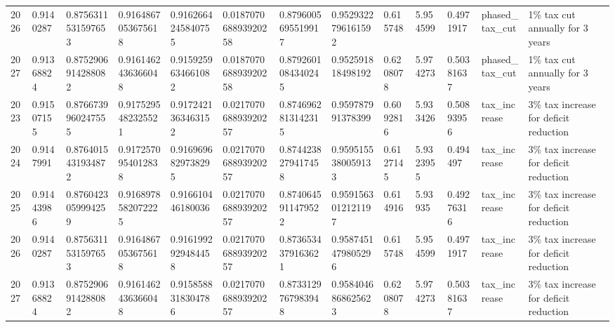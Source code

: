 \begin{sidewaystable}[H]
\begin{tabular}{|l|l|l|l|l|l|l|l|l|l|l|l|l|}
2026 & 0.9140287 & 0.8756311531597653 & 0.9164867053675618 & 0.9162664245840755 & 0.018707068893920258 & 0.8796005695519917 & 0.9529322796161592 & 0.615748 & 5.954599 & 0.4971917 & phased\_tax\_cut & 1\% tax cut annually for 3 years \\
2027 & 0.91368824 & 0.8752906914288082 & 0.9161462436366048 & 0.9159259634661082 & 0.018707068893920258 & 0.8792601084340245 & 0.952591818498192 & 0.6208078 & 5.974273 & 0.50381637 & phased\_tax\_cut & 1\% tax cut annually for 3 years \\
\hline
2023 & 0.91507155 & 0.8766739960247555 & 0.9175295482325521 & 0.9172421363463152 & 0.021707068893920257 & 0.8746962813142315 & 0.959787991378399 & 0.6092816 & 5.933426 & 0.50893956 & tax\_increase & 3\% tax increase for deficit reduction \\
2024 & 0.9147991 & 0.8764015431934872 & 0.9172570954012838 & 0.9169696829738295 & 0.021707068893920257 & 0.8744238279417458 & 0.9595155380059133 & 0.6127145 & 5.9323955 & 0.494497 & tax\_increase & 3\% tax increase for deficit reduction \\
2025 & 0.91443986 & 0.8760423059994259 & 0.9168978582072225 & 0.916610446180036 & 0.021707068893920257 & 0.8740645911479522 & 0.9591563012121197 & 0.614916 & 5.93935 & 0.49276316 & tax\_increase & 3\% tax increase for deficit reduction \\
2026 & 0.9140287 & 0.8756311531597653 & 0.9164867053675618 & 0.9161992929484458 & 0.021707068893920257 & 0.8736534379163621 & 0.9587451479805296 & 0.615748 & 5.954599 & 0.4971917 & tax\_increase & 3\% tax increase for deficit reduction \\
2027 & 0.91368824 & 0.8752906914288082 & 0.9161462436366048 & 0.9158588318304786 & 0.021707068893920257 & 0.8733129767983948 & 0.9584046868625623 & 0.6208078 & 5.974273 & 0.50381637 & tax\_increase & 3\% tax increase for deficit reduction \\
\hline
\end{tabular}
\label{tab:scenario_forecasts}
\end{sidewaystable}













